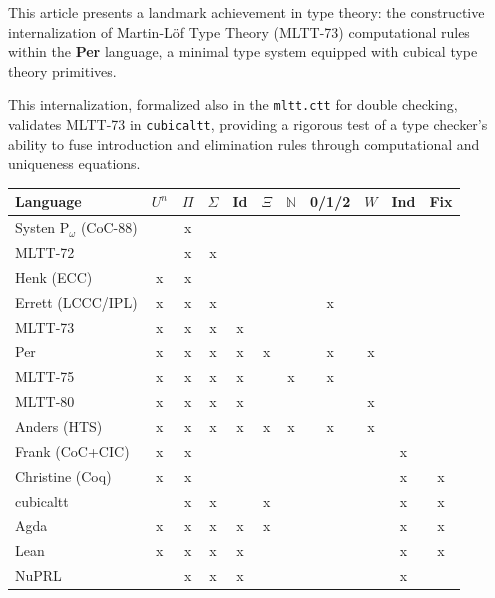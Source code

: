 \documentclass{article}
\begin{document}
This article presents a landmark achievement in type theory:
the constructive internalization of Martin-Löf Type Theory (MLTT-73) computational rules
within the \textbf{Per} language, a minimal type system equipped with
cubical type theory primitives.

This internalization, formalized also in the \texttt{mltt.ctt} for double checking,
validates MLTT-73 in \texttt{cubicaltt}, providing a rigorous test
of a type checker's ability to fuse introduction and elimination
rules through computational and uniqueness equations.

\begin{table}[!ht]
  \begin{tabular}{lcccccccccc}
    \hline
       Language             & $U^n$
                                & $\Pi$
                                    & $\Sigma$
                                        & Id
                                            & $\Xi$
                                                & $\mathbb{N}$
                                                    & 0/1/2
                                                        & $W$
                                                            & Ind
                                                                & Fix \\
    \hline
Systen P$_\omega$ (CoC-88)  &   & x &   &   &   &   &   &   &   &   \\
       MLTT-72              &   & x & x &   &   &   &   &   &   &   \\
       Henk (ECC)           & x & x &   &   &   &   &   &   &   &   \\
       Errett (LCCC/IPL)    & x & x & x &   &   &   & x &   &   &   \\
       MLTT-73              & x & x & x & x &   &   &   &   &   &   \\
       Per                  & x & x & x & x & x &   & x & x &   &   \\
       MLTT-75              & x & x & x & x &   & x & x &   &   &   \\
       MLTT-80              & x & x & x & x &   &   &   & x &   &   \\
       Anders (HTS)         & x & x & x & x & x & x & x & x &   &   \\
       Frank (CoC+CIC)      & x & x &   &   &   &   &   &   & x &   \\
       Christine (Coq)      & x & x &   &   &   &   &   &   & x & x \\
    \hline
       cubicaltt            &   & x & x &   & x &   &   &   & x & x \\
       Agda                 & x & x & x & x & x &   &   &   & x & x \\
       Lean                 & x & x & x & x &   &   &   &   & x & x \\
       NuPRL                &   & x & x & x &   &   &   &   & x &   \\
    \hline
  \end{tabular}
\end{table}
\end{document}

